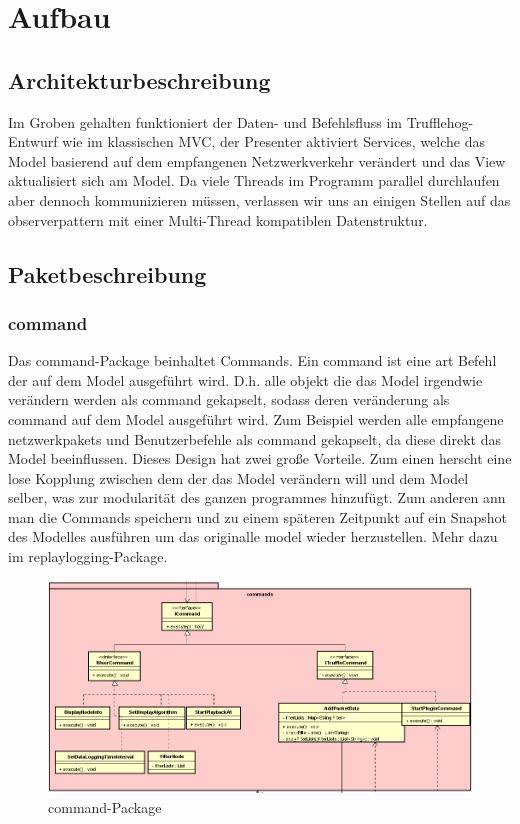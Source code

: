 \chapter{Aufbau \programname}

\section{Architekturbeschreibung}
Im Groben gehalten funktioniert der Daten- und Befehlsfluss im Trufflehog-Entwurf
wie im klassischen MVC, der Presenter aktiviert Services, welche das Model basierend
auf dem empfangenen Netzwerkverkehr verändert und das View aktualisiert sich am Model.
Da viele Threads im Programm parallel durchlaufen aber dennoch kommunizieren müssen,
verlassen wir uns an einigen Stellen auf das \gls{observerpattern} mit einer
Multi-Thread kompatiblen Datenstruktur.\newline
\newline

\section{Paketbeschreibung}

\subsection{command}
Das command-Package beinhaltet Commands. Ein command ist eine art Befehl der auf
dem Model ausgeführt wird. D.h. alle objekt die das Model irgendwie verändern
werden als command gekapselt, sodass deren veränderung als command auf dem Model
ausgeführt wird. Zum Beispiel werden alle empfangene netzwerk\glspl{paket} und
Benutzerbefehle als command gekapselt, da diese direkt das Model beeinflussen.
\newline
\newline
Dieses Design hat zwei große Vorteile. Zum einen herscht eine lose Kopplung zwischen
dem der das Model verändern will und dem Model selber, was zur modularität des ganzen
programmes hinzufügt. Zum anderen ann man die Commands speichern und zu einem
späteren Zeitpunkt auf ein Snapshot des Modelles ausführen um das originalle
model wieder herzustellen. Mehr dazu im replaylogging-Package.
\newline
\newline
\begin{figure}[H]
  \centering
  \includegraphics[width=\textwidth]{../diagramimages/commands.png}
  \caption{command-Package}
\end{figure}

